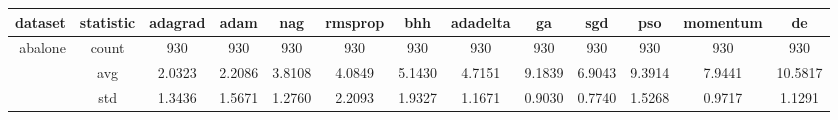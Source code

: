 \begin{table}[htbp]
{\begin{tabular}{rcccccccccccc}
                  \cmidrule{3-3}    \textbf{dataset} & \multicolumn{1}{l}{\textbf{statistic}} & \textbf{adagrad}                                                                   & \textbf{adam}                                                             & \textbf{nag}                                                              & \textbf{rmsprop}                                                          & \textbf{bhh}                                  & \textbf{adadelta}                           & \textbf{ga}                                    & \textbf{sgd}                                   & \textbf{pso}                                   & \textbf{momentum}                              & \textbf{de}                                    \\
                  \midrule
                  abalone                            & count                                  & 930                                                                                & 930                                                                       & 930                                                                       & 930                                                                       & 930                                           & 930                                         & 930                                            & 930                                            & 930                                            & 930                                            & 930                                            \\
                                                     & avg                                    & \cellcolor[rgb]{ .776,  .937,  .808}\textcolor[rgb]{ 0,  .38,  0}{2.0323}          & 2.2086                                                                    & 3.8108                                                                    & 4.0849                                                                    & 5.1430                                        & 4.7151                                      & 9.1839                                         & 6.9043                                         & 9.3914                                         & 7.9441                                         & 10.5817                                        \\
                                                     & std                                    & 1.3436                                                                             & 1.5671                                                                    & 1.2760                                                                    & 2.2093                                                                    & 1.9327                                        & 1.1671                                      & 0.9030                                         & 0.7740                                         & 1.5268                                         & 0.9717                                         & 1.1291                                         \\

\end{tabular}}
\end{table}
